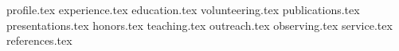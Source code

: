 \documentclass[11pt, a4paper]{awesome-cv}
\newcommand*{\sectiondir}{resume/}
\begin{document}
\makecvheader

{profile.tex}
{experience.tex}
{education.tex}
{volunteering.tex}
{publications.tex}
{presentations.tex}
{honors.tex}
{teaching.tex}
\clearpage
{outreach.tex}
{observing.tex}
{service.tex}
{references.tex}
\end{document}
